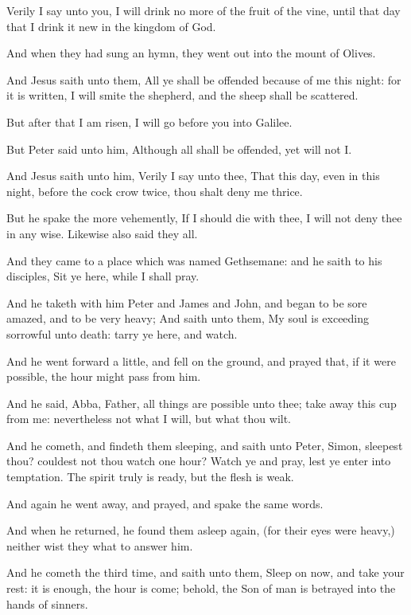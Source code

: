 \verse Verily I say unto you, I will drink no more of the fruit of the vine, until that day that I drink it new in the kingdom of God.

\verse And when they had sung an hymn, they went out into the mount of Olives.

\verse And Jesus saith unto them, All ye shall be offended because of me this night: for it is written, I will smite the shepherd, and the sheep shall be scattered.

\verse But after that I am risen, I will go before you into Galilee.

\verse But Peter said unto him, Although all shall be offended, yet will not I.

\verse And Jesus saith unto him, Verily I say unto thee, That this day, even in this night, before the cock crow twice, thou shalt deny me thrice.

\verse But he spake the more vehemently, If I should die with thee, I will not deny thee in any wise. Likewise also said they all.

\verse And they came to a place which was named Gethsemane: and he saith to his disciples, Sit ye here, while I shall pray.

\verse And he taketh with him Peter and James and John, and began to be sore amazed, and to be very heavy; \verse And saith unto them, My soul is exceeding sorrowful unto death: tarry ye here, and watch.

\verse And he went forward a little, and fell on the ground, and prayed that, if it were possible, the hour might pass from him.

\verse And he said, Abba, Father, all things are possible unto thee; take away this cup from me: nevertheless not what I will, but what thou wilt.

\verse And he cometh, and findeth them sleeping, and saith unto Peter, Simon, sleepest thou? couldest not thou watch one hour?  \verse Watch ye and pray, lest ye enter into temptation. The spirit truly is ready, but the flesh is weak.

\verse And again he went away, and prayed, and spake the same words.

\verse And when he returned, he found them asleep again, (for their eyes were heavy,) neither wist they what to answer him.

\verse And he cometh the third time, and saith unto them, Sleep on now, and take your rest: it is enough, the hour is come; behold, the Son of man is betrayed into the hands of sinners.

